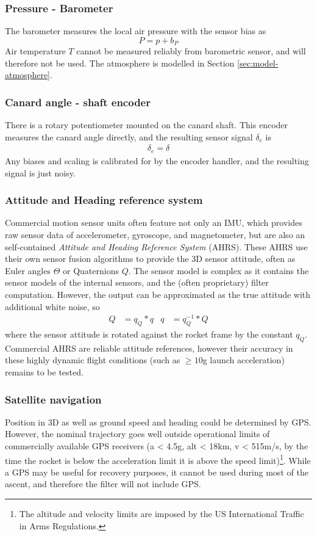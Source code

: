 \subsubsection{Pressure - Barometer}
The barometer measures the local air pressure with the sensor bias as
\begin{equation}
    P = p + b_P
\end{equation}
Air temperature $T$ cannot be measured reliably from barometric sensor, and will therefore not be used.
The atmosphere is modelled in Section \ref{sec:model-atmosphere}.

\subsubsection{Canard angle - shaft encoder}
There is a rotary potentiometer mounted on the canard shaft.
This encoder measures the canard angle directly, and the resulting sensor signal $\delta_e$ is 
\begin{align}
    \delta_e = \delta
\end{align}
Any biases and scaling is calibrated for by the encoder handler, and the resulting signal is just noisy. 

\subsubsection{Attitude and Heading reference system}
Commercial motion sensor units often feature not only an IMU, which provides raw sensor data of accelerometer, gyroscope, and magnetometer, but are also an self-contained \emph{Attitude and Heading Reference System} (AHRS).
These AHRS use their own sensor fusion algorithms to provide the 3D sensor attitude, often as Euler angles $\Theta$ or Quaternions $Q$.
The sensor model is complex as it contains the sensor models of the internal sensors, and the (often proprietary) filter computation.
However, the output can be approximated as the true attitude with additional white noise, so
\begin{align}
    Q &= q_Q * q & q &= q_Q^{-1} * Q
\end{align}
where the sensor attitude is rotated against the rocket frame by the constant $q_Q$.
Commercial AHRS are reliable attitude references, however their accuracy in these highly dynamic flight conditions (such as $\geq 10$g launch acceleration) remains to be tested.


\subsubsection{Satellite navigation}
Position in 3D as well as ground speed and heading could be determined by GPS.
However, the nominal trajectory goes well outside operational limits of commercially available GPS receivers (a < 4.5g, alt < 18km, v < 515m/s, by the time the rocket is below the acceleration limit it is above the speed limit)\footnote{The altitude and velocity limits are imposed by the US International Traffic in Arms Regulations.}.
While a GPS may be useful for recovery purposes, it cannot be used during most of the ascent, and therefore the filter will not include GPS.

